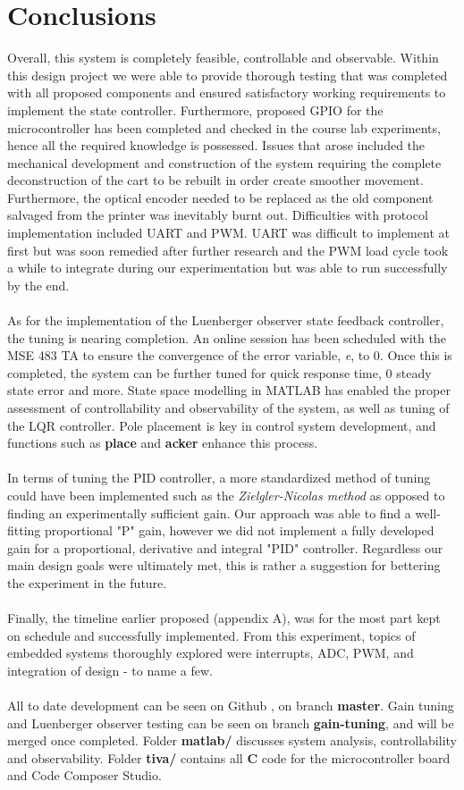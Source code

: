 \documentclass[12pt]{article}
\begin{document}
\section{Conclusions}
Overall, this system is completely feasible, controllable and observable. Within this design project we were able to provide thorough testing that was completed with all proposed components and ensured satisfactory working requirements to implement the state controller. Furthermore, proposed GPIO for the microcontroller has been completed and checked in the course lab experiments, hence all the required knowledge is possessed. Issues that arose included the mechanical development and construction of the system requiring the complete deconstruction of the cart to be rebuilt in order create smoother movement. Furthermore, the optical encoder needed to be replaced as the old component salvaged from the printer was inevitably burnt out. Difficulties with protocol implementation included UART and PWM. UART was difficult to implement at first but was soon remedied after further research and the PWM load cycle took a while to integrate during our experimentation but was able to run successfully by the end. 
\\\\
As for the implementation of the Luenberger observer state feedback controller, the tuning is nearing completion. An online session has been scheduled with the MSE 483 TA to ensure the convergence of the error variable, \textit{e}, to 0. Once this is completed, the system can be further tuned for quick response time, 0 steady state error and more. State space modelling in MATLAB has enabled the proper assessment of controllability and observability of the system, as well as tuning of the LQR controller. Pole placement is key in control system development, and functions such as \textbf{place} and \textbf{acker} enhance this process.
\\\\
In terms of tuning the PID controller, a more standardized method of tuning could have been implemented such as the \textit{Zielgler-Nicolas method} as opposed to finding an experimentally sufficient gain. Our approach was able to find a well-fitting proportional "P" gain, however we did not implement a fully developed gain for a proportional, derivative and integral "PID" controller. Regardless our main design goals were ultimately met, this is rather a suggestion for bettering the experiment in the future. 
\\\\
Finally, the timeline earlier proposed (appendix A),  was for the most part kept on schedule and successfully implemented. From this experiment, topics of embedded systems thoroughly explored were interrupts, ADC, PWM, and integration of design - to name a few.
\\\\
All to date development can be seen on Github \cite{github}, on branch \textbf{master}. Gain tuning and Luenberger observer testing can be seen on branch \textbf{gain-tuning}, and will be merged once completed. Folder \textbf{matlab/} discusses system analysis, controllability and observability. Folder \textbf{tiva/} contains all \textbf{C} code for the microcontroller board and Code Composer Studio.
\end{document}
